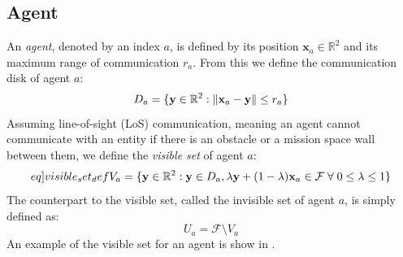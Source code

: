 \subsection{Agent}
An \textit{agent}, denoted by an index $a$, is defined by its position $\mathbf{x}_{a}\in\mathbb{R}^{2}$ and 
its maximum range of communication $r_{a}$. From this we define the communication disk of agent $a$:
\begin{equation}
  D_{a} = \{\mathbf{y}\in\mathbb{R}^{2}: \left\lVert\mathbf{x}_{a} - \mathbf{y}\right\rVert\leq r_{a}\}
\end{equation}
Assuming line-of-sight (LoS) communication, meaning an agent cannot communicate with an entity if there is an obstacle or a mission space wall between them, we define the \textit{visible set} of agent 
$a$:
\begin{equation}\label[eq]{visible_set_def}
  V_{a} = \{\mathbf{y}\in\mathbb{R}^{2}:\mathbf{y}\in D_{a}, \lambda\mathbf{y} + (1-\lambda)\mathbf{x}_{a}\in\mathcal{F}\;\forall\;0\leq\lambda\leq 1\}
\end{equation}
The counterpart to the visible set, called the invisible set of agent $a$, is simply defined as:
\begin{equation}
  U_{a} = \mathcal{F}\setminus V_{a}
\end{equation}
An example of the visible set for an agent is show in .

